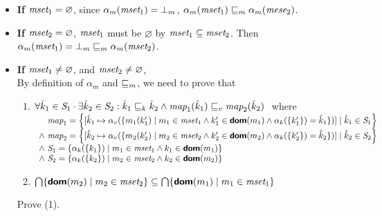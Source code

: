 \begin{itemize}
\item \textbf{If} $\emph{mset}_1 = \varnothing$,
since $\alpha_m(\emph{mset}_1) = \bot_m$,
$\alpha_m(\emph{mset}_1) \sqsubseteq_m \alpha_m(\emph{mese}_2)$.
\item \textbf{If} $\emph{mset}_2 = \varnothing$,
$\emph{mset}_1$ must be $\varnothing$ by $\emph{mset}_1 \subseteq \emph{mset}_2$.
Then $\alpha_m(\emph{mset}_1) = \bot_m \sqsubseteq_m \alpha_m(\emph{mset}_2)$.
\item\textbf{If} $\emph{mset}_1 \neq \varnothing$, and $\emph{mset}_2 \neq \varnothing$, \\
By definition of $\alpha_m$ and $\sqsubseteq_m$, we need to prove that
\begin{enumerate}[label=({\arabic*})]
\item $\forall \hat{k}_1 \in \emph{S}_1 \cdot \exists \hat{k}_2 \in \emph{S}_2:
\hat{k}_1 \sqsubseteq_k \hat{k}_2 \land \emph{map}_1(\hat{k}_1) \sqsubseteq_v \emph{map}_2(\hat{k}_2) ~ $
where \\
$\begin{array}{l}
\quad \emph{map}_1 = \left \{[ \hat{k}_1 \mapsto \alpha_{v}( \{ m_1(k_1') \mid m_1 \in \emph{mset}_1
\land k_1' \in \textsf{\textbf{dom}}(m_1) \land \alpha_k(\{k_1'\}) = \hat{k}_1 \} ) ]
\mid \hat{k}_1 \in \emph{S}_1  \right \}\\
\land~ \emph{map}_2 = \left \{[ \hat{k}_2 \mapsto \alpha_{v}( \{ m_2(k_2') \mid m_2 \in \emph{mset}_2
\land k_2' \in \textsf{\textbf{dom}}(m_2) \land \alpha_k(\{k_2'\}) = \hat{k}_2 \} ) ]
\mid \hat{k}_2 \in \emph{S}_2  \right \}\\
\land~ \emph{S}_1 = \{ \alpha_k(\{ k_1 \}) \mid m_1 \in \emph{mset}_1 \land k_1 \in \textsf{\textbf{dom}}(m_1) \} \\
\land~ \emph{S}_2 = \{ \alpha_k(\{ k_2 \}) \mid m_2 \in \emph{mset}_2 \land k_2 \in \textsf{\textbf{dom}}(m_2) \} \\
\end{array}$
\item $\bigcap\{ \textsf{\textbf{dom}}(m_2) \mid m_2 \in \emph{mset}_2\} \subseteq 
\bigcap\{ \textsf{\textbf{dom}}(m_1) \mid m_1 \in \emph{mset}_1\}$
\end{enumerate}
Prove (1). 
\end{itemize}
